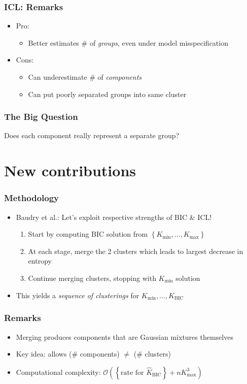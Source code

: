 \documentclass[mathserif,compress]{beamer}
\newcommand*\set[1]{\left\{#1\right\}}
\newcommand*\estim[1]{\widehat{#1}}
\renewcommand\;{\,}
\begin{document}
\begin{frame}\frametitle{ICL: Remarks}
\begin{itemize}
\item[]
\alert{Pro:} 
\medskip
\begin{itemize}
\item
Better estimates \# of \emph{groups}, even under model misspecification
\end{itemize}
\bigskip
\item[]
\alert{Cons:}
\medskip
\begin{itemize}
\item
Can underestimate \# of \emph{components}
\bigskip
\item
Can put poorly separated groups into same cluster 
\end{itemize}
\end{itemize}
\end{frame}

\begin{frame}\frametitle{The Big Question}
\large
\begin{center}
 Does each \alert{component} really represent a separate \alert{group}?
\end{center}
\end{frame}

\section{New contributions}
\begin{frame}\frametitle{Methodology}
\begin{itemize}
\item[]
\alert{Baudry et al.:}
Let's exploit respective strengths of BIC \& ICL!
\bigskip
\begin{enumerate}
\item
Start by computing BIC solution from $\set{K_\text{min}, \dotsc, K_\text{max}}$
\bigskip
\item
At each stage, merge the 2 clusters which leads to largest decrease in entropy
\bigskip
\item
Continue merging clusters, stopping with $K_\text{min}$ solution
\end{enumerate} 
\bigskip
\item[]
This yields a \emph{sequence of clusterings} for $K_\text{min}, \dotsc, \estim K_\text{BIC}$
\end{itemize}
\end{frame}

\begin{frame}\frametitle{Remarks}
\begin{itemize}
\item[]
Merging produces components that are \alert{Gaussian mixtures themselves}
\bigskip
\item[]
\alert{Key idea:} allows (\# components) $\ne$ (\# clusters)
\bigskip
\item[]
Computational complexity: $\mathcal O \left( \left\{\text{rate for } \estim K_\text{BIC} \right\}+ n K_\text{max}^3 \right)$
\end{itemize}
\end{frame}
\end{document}
